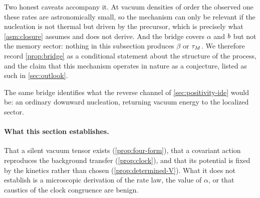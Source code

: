 Two honest caveats accompany it. At vacuum densities of order the observed one
these rates are astronomically small, so the mechanism can only be relevant if
the nucleation is not thermal but driven by the precursor, which is precisely
what \cref{asm:closure} assumes and does not derive. And the bridge covers
$\alpha$ and $b$ but not the memory sector: nothing in this subsection
produces $\beta$ or $\tau_{M}$. We therefore record \cref{prop:bridge} as a
conditional statement about the structure of the process, and the claim that
this mechanism operates in nature as a conjecture, listed as such in
\cref{sec:outlook}.

The same bridge identifies what the reverse channel of
\cref{sec:positivity-ide} would be: an ordinary downward nucleation, returning
vacuum energy to the localized sector.

\paragraph{What this section establishes.}
That a silent vacuum tensor exists (\cref{prop:four-form}), that a covariant
action reproduces the background transfer (\cref{prop:clock}), and that its
potential is fixed by the kinetics rather than chosen
(\cref{prop:determined-V}). What it does not establish is a microscopic
derivation of the rate law, the value of $\alpha$, or that caustics of the
clock congruence are benign.
